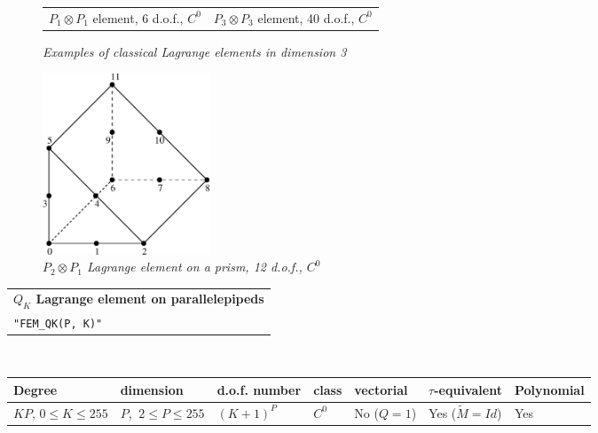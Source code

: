 \documentclass[11pt,a4paper]{article}
\begin{document}
\begin{figure}[H]
\begin{center}
\begin{tabular}{m{7cm}m{7cm}}
    $P_1 \otimes P_1$ element, 6 d.o.f., $C^0$ & $P_3 \otimes P_3$ element, 40 d.o.f., $C^0$ \\
  \end{tabular} \end{center}
  \caption{ \it Examples of classical Lagrange elements in dimension 3} \label{fig:prodpktrois}
\end{figure}


\begin{figure}[H]
  \begin{center}
    \includegraphics[width=5cm,angle=0]{getfemlist_prism_P2_P1.eps}
  \end{center}
  \caption{ \it $P_2 \otimes P_1$ Lagrange element on a prism, 12 d.o.f., $C^0$} 
  \label{fig:prism_P2_p1}
\end{figure}


\begin{center}
\begin{tabular}{|m{16.109cm}|} \hline 
{\bf $Q_K$ Lagrange element on parallelepipeds}\\
{\tt "FEM\_QK(P, K)"} 
\end{tabular} \\ \vspace{-1pt} 
\begin{tabular}{|m{2cm}|m{2cm}|m{2.5cm}|m{1.5cm}|m{1.5cm}|m{2cm}|m{2cm}|} \hline 
Degree & dimension & d.o.f. number & class & vectorial & \mbox{$\tau$-equivalent} & Polynomial \\ \hline
\small $KP$, \mbox{$0 \leq K \leq 255$} & \small $P$, \mbox{$\ 2 \leq P \leq 255$} & $(K+1)^P$ & $C^0$ & No \mbox{($Q = 1$)} & Yes \mbox{($\tilde{M} = Id$)}  & Yes \\ \hline
\end{tabular}
\end{center}
\end{document}
